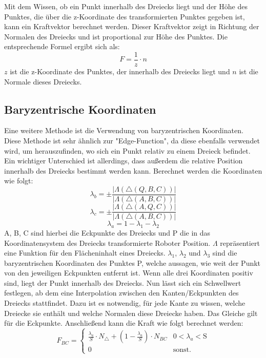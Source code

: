 \documentclass[conference]{IEEEtran}
\begin{document}
Mit dem Wissen, ob ein Punkt innerhalb des Dreiecks liegt und der Höhe des Punktes, die über die z-Koordinate des transformierten Punktes gegeben ist, kann ein Kraftvektor berechnet werden. Dieser Kraftvektor zeigt in Richtung der Normalen des Dreiecks und ist proportional zur Höhe des Punktes. Die entsprechende Formel ergibt sich als:
\begin{equation}
    F = \frac{1}{z} \cdot n
\end{equation}
$z$ ist die z-Koordinate des Punktes, der innerhalb des Dreiecks liegt und $n$ ist die Normale dieses Dreiecks.

\subsection{Baryzentrische Koordinaten} \label{bary}
Eine weitere Methode ist die Verwendung von baryzentrischen Koordinaten. Diese Methode ist sehr ähnlich zur "Edge-Function", da diese ebenfalls verwendet wird, um herauszufinden, wo sich ein Punkt relativ zu einem Dreieck befindet. Ein wichtiger Unterschied ist allerdings, dass außerdem die relative Position innerhalb des Dreiecks bestimmt werden kann. Berechnet werden die Koordinaten wie folgt:
\begin{equation*}
    \lambda_b = \pm\frac{|\Lambda(\triangle(Q,B,C))|}{|\Lambda(\triangle(A,B,C))|}
\end{equation*}
\begin{equation}
    \lambda_c = \pm\frac{|\Lambda(\triangle(A,Q,C))|}{|\Lambda(\triangle(A,B,C))|}
\end{equation}
\begin{equation*}
    \lambda_a = 1 - \lambda_1 - \lambda_2
\end{equation*}
A, B, C sind hierbei die Eckpunkte des Dreiecks und P die in das Koordinatensystem des Dreiecks transformierte Roboter Position. $\Lambda$ repräsentiert eine Funktion für den Flächeninhalt eines Dreiecks. $\lambda_1$, $\lambda_2$ und $\lambda_3$ sind die baryzentrischen Koordinaten des Punktes P, welche aussagen, wie weit der Punkt von den jeweiligen Eckpunkten entfernt ist. Wenn alle drei Koordinaten positiv sind, liegt der Punkt innerhalb des Dreiecks. Nun lässt sich ein Schwellwert festlegen, ab dem eine Interpolation zwischen den Kanten/Eckpunkten des Dreiecks stattfindet. Dazu ist es notwendig, für jede Kante zu wissen, welche Dreiecke sie enthält und welche Normalen diese Dreiecke haben. Das Gleiche gilt für die Eckpunkte. Anschließend kann die Kraft wie folgt berechnet werden:
\begin{equation*}
    F_{BC} = 
    \begin{cases} 
        \frac{\lambda_a}{S}\cdot N_{\triangle} + (1-\frac{\lambda_a}{S})\cdot N_{BC} &  0 < \lambda_a < \text{S} \\
        0 & \text{sonst.}
    \end{cases}
\end{equation*}
\end{document}
